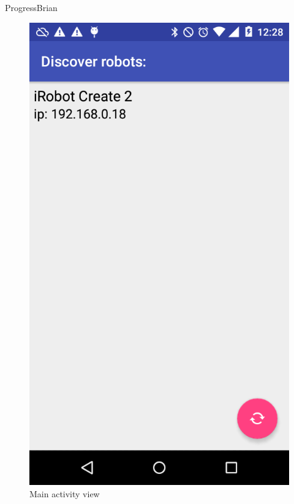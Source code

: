 \documentclass{beamer}
\begin{document}
\begin{frame}{Progress}{Brian}
    \begin{figure}
        \centering
        \includegraphics[scale=0.17]{figs/img/discoveryActivityMappingApp7-8-20[1].png}
        \caption{Main activity view}
        \label{fig:main_activity_img}
    \end{figure}
\end{frame}
\end{document}
